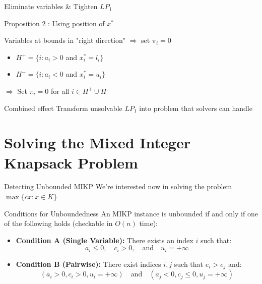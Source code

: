 \documentclass[aspectratio=169,xcolor=dvipsnames]{beamer}
\begin{document}
\begin{frame}{Eliminate variables \& Tighten $LP_1$}
	\begin{block}{ Proposition 2 : Using position of $x^*$}
		
			Variables at bounds in "right direction" $\Rightarrow$ set $\pi_i = 0$
			
			\begin{definition}
				\begin{itemize}
					\item $H^+ = \{i : a_i > 0$ and $x^*_i = l_i\}$ 
					\item $H^- = \{i : a_i < 0$ and $x^*_i = u_i\}$ 
				\end{itemize}
				$\Rightarrow$ Set $\pi_i = 0$ for all $i \in H^+ \cup H^-$
			\end{definition}
			
	\end{block}
	
		\vspace{0.3cm}
	\begin{exampleblock}{Combined effect}
		Transform unsolvable $LP_1$ into  problem that solvers can handle
	\end{exampleblock}
\end{frame}





\section{Solving the Mixed Integer Knapsack Problem}

\begin{frame}{Detecting Unbounded MIKP}
    We're interested now in solving the problem $\max \{ cx : x \in K \} $
    \begin{block}{Conditions for Unboundedness}
        An MIKP instance is unbounded if and only if one of the following holds (checkable in $O(n)$ time):
        \begin{itemize}
            \item \textbf{Condition A (Single Variable):} There exists an index $i$ such that:
            \[ a_i \leq 0, \quad c_i > 0, \quad \text{and} \quad u_i = +\infty \]
            
            \item \textbf{Condition B (Pairwise):} There exist indices $i, j$ such that $e_i > e_j$ and:
            \[
            (a_i > 0, c_i > 0, u_i = +\infty) \quad \text{and} \quad (a_j < 0, c_j \leq 0, u_j = +\infty)
            \]
        \end{itemize}
    \end{block}
\end{frame}
\end{document}
